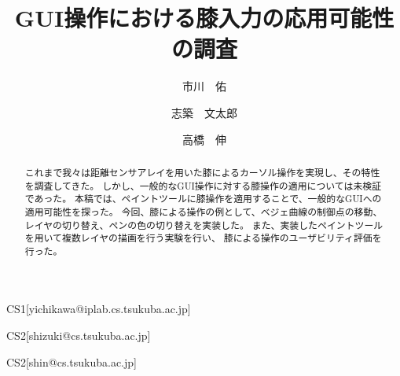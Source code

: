 \documentclass[submit, techrep]{ipsj}
\begin{document}
\title{GUI操作における膝入力の応用可能性の調査}






\author{市川　佑}{}{CS1}[yichikawa@iplab.cs.tsukuba.ac.jp]
\author{志築　文太郎}{}{CS2}[shizuki@cs.tsukuba.ac.jp]
\author{高橋　伸}{}{CS2}[shin@cs.tsukuba.ac.jp]

\begin{abstract}
これまで我々は距離センサアレイを用いた膝によるカーソル操作を実現し、その特性を調査してきた。
しかし、一般的なGUI操作に対する膝操作の適用については未検証であった。
本稿では、ペイントツールに膝操作を適用することで、一般的なGUIへの適用可能性を探った。
今回、膝による操作の例として、ベジェ曲線の制御点の移動、
レイヤの切り替え、ペンの色の切り替えを実装した。
また、実装したペイントツールを用いて複数レイヤの描画を行う実験を行い、
膝による操作のユーザビリティ評価を行った。
\end{abstract}






\maketitle

\end{document}
